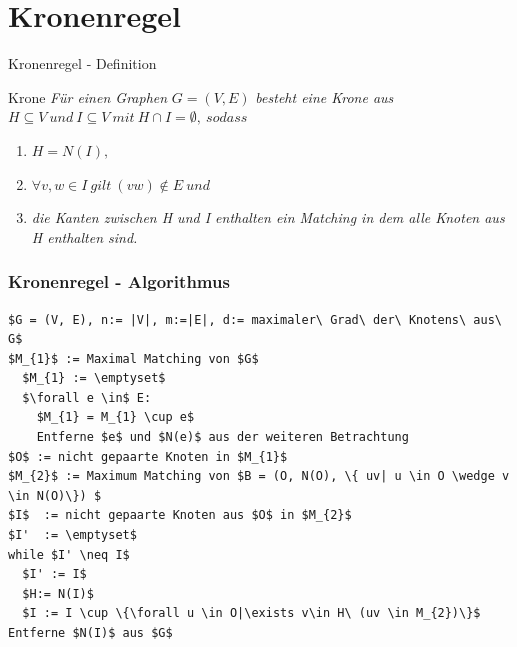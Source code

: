\documentclass{beamer}
\begin{document}
\section{Kronenregel}

\begin{frame}{Kronenregel - Definition}
\begin{block}{Krone}\pause
\textit{Für einen Graphen} $G=(V,E)$ \textit{besteht eine Krone aus} $H \subseteq V\ und\ I \subseteq V\ mit\ H \cap I = \emptyset,\ sodass$ \pause
\begin{enumerate}
\item $H = N(I),$ \pause
\item $\forall v, w \in I\ gilt\ (vw) \notin E\ und$\pause
\item \textit{die Kanten zwischen H und I enthalten ein Matching in dem alle Knoten aus H enthalten sind.}
\end{enumerate}
\end{block}
\end{frame}

\begin{frame}[fragile]
\frametitle{Kronenregel - Algorithmus}
\begin{lstlisting}[mathescape=true, escapechar = !,basicstyle=\ttfamily\scriptsize]
$G = (V, E), n:= |V|, m:=|E|, d:= maximaler\ Grad\ der\ Knotens\ aus\ G$
$M_{1}$ := Maximal Matching von $G$
  $M_{1} := \emptyset$
  $\forall e \in$ E:
    $M_{1} = M_{1} \cup e$
    Entferne $e$ und $N(e)$ aus der weiteren Betrachtung
$O$ := nicht gepaarte Knoten in $M_{1}$
$M_{2}$ := Maximum Matching von $B = (O, N(O), \{ uv| u \in O \wedge v \in N(O)\}) $
$I$  := nicht gepaarte Knoten aus $O$ in $M_{2}$
$I'  := \emptyset$
while $I' \neq I$
  $I' := I$
  $H:= N(I)$
  $I := I \cup \{\forall u \in O|\exists v\in H\ (uv \in M_{2})\}$
Entferne $N(I)$ aus $G$
\end{lstlisting}
\end{frame}
\end{document}
